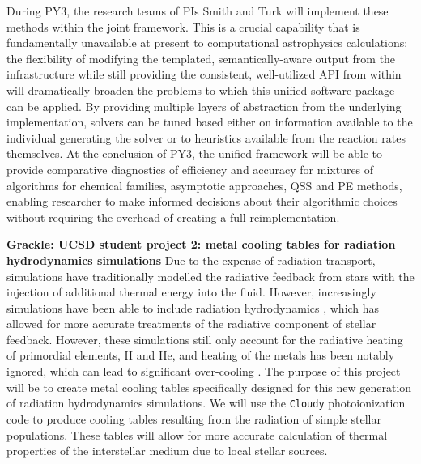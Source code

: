 During PY3, the research teams of PIs Smith and Turk will implement these
methods within the joint framework.  This is a crucial capability that is
fundamentally unavailable at present to computational astrophysics
calculations; the flexibility of modifying the templated, semantically-aware
output from the \dengo{} infrastructure while still providing the consistent,
well-utilized API from within \grackle{} will dramatically broaden the problems
to which this unified software package can be applied.  By providing multiple
layers of abstraction from the underlying implementation, solvers can be tuned
based either on information available to the individual generating the solver
or to heuristics available from the reaction rates themselves.  At the
conclusion of PY3, the unified framework will be able to provide comparative
diagnostics of efficiency and accuracy for mixtures of algorithms for chemical
families, asymptotic approaches, QSS and PE methods, enabling researcher to
make informed decisions about their algorithmic choices without requiring the
overhead of creating a full reimplementation.

\noindent \textbf{Grackle: UCSD student project 2: metal cooling
  tables for radiation hydrodynamics simulations}
Due to the expense of radiation transport, simulations have
traditionally modelled the radiative feedback from stars with the
injection of additional thermal energy into the fluid.  However,
increasingly simulations have been able to include radiation
hydrodynamics \citep{2012MNRAS.427..311W, Xu_2013, Wise_2014,
2015ApJ...807L..12O}, which has allowed for more accurate treatments of the
radiative component of stellar feedback.  However, these simulations
still only account for the radiative heating of primordial elements, H
and He, and heating of the metals has been notably ignored, which can
lead to significant over-cooling \citep{2011MNRAS.413..190T,
  2012MNRAS.427..311W}.  The purpose of this project will be to create
metal cooling tables specifically designed for this new generation of
radiation hydrodynamics simulations.  We will use the \texttt{Cloudy}
photoionization code to produce cooling tables resulting from the
radiation of simple stellar populations.  These tables will allow for
more accurate calculation of thermal properties of the interstellar
medium due to local stellar sources.



